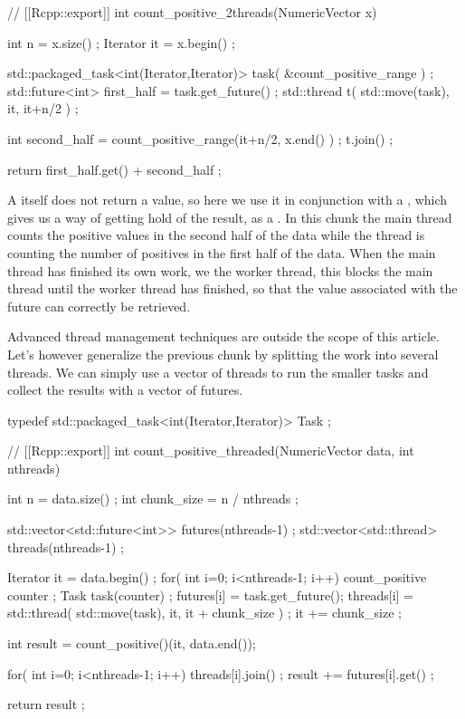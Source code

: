 \begin{example}
// [[Rcpp::export]]
int count_positive_2threads(NumericVector x){
  int n = x.size() ;
  Iterator it = x.begin() ;
                                         
  std::packaged_task<int(Iterator,Iterator)> task( &count_positive_range ) ;
  std::future<int> first_half = task.get_future() ;
  std::thread t( std::move(task), it, it+n/2 ) ;            
  
  int second_half = count_positive_range(it+n/2, x.end() ) ;
  t.join() ;
  
  return first_half.get() + second_half ;
}
\end{example}

A  itself does not return a value, so here we use it in conjunction
with a , which gives us a way of getting hold of the result, 
as a . In this chunk the main thread counts the positive
values in the second half of the data while the thread  is counting the 
number of positives in the first half of the data. When the main thread has finished
its own work, we  the worker thread, this blocks the main thread until
the worker thread has finished, so that the value associated with the
future can correctly be retrieved. 

Advanced thread management techniques are outside the scope of this 
article. Let's however generalize the previous chunk by splitting the work 
into several threads. We can simply use a vector of threads to run the smaller
tasks and collect the results with a vector of futures. 

\begin{example}
typedef std::packaged_task<int(Iterator,Iterator)> Task ;

// [[Rcpp::export]]
int count_positive_threaded(NumericVector data, int nthreads){
  int n = data.size() ;
  int chunk_size = n / nthreads ; 
  
  std::vector<std::future<int>> futures(nthreads-1) ;
  std::vector<std::thread> threads(nthreads-1) ;
  
  Iterator it = data.begin() ;
  for( int i=0; i<nthreads-1; i++){
    count_positive counter ;        
    Task task(counter) ;
    futures[i] = task.get_future();
    threads[i] = std::thread( std::move(task), it, it + chunk_size ) ;
    it += chunk_size ;
  }
  
  int result = count_positive()(it, data.end()); 
  
  for( int i=0; i<nthreads-1; i++){
    threads[i].join() ;
    result += futures[i].get() ;  
  }
                            
  return result ;
}
\end{example}


